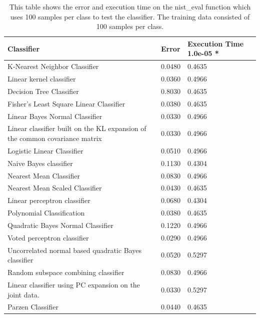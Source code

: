 \documentclass[%
        compressed,
        final,
        notitlepage,
        narroweqnarray,
        inline,
        twoside,
        ]{ieee}
\begin{document}
\begin{table}
    \begin{tabular} {p{5cm}lp{1.5cm}} %
        \hline
    Classifier & Error & Execution Time 1.0e-05 * \\
        \hline
K-Nearest Neighbor Classifier & 0.0480 & 0.4635 \\
Linear kernel classifier & 0.0360 & 0.4966 \\
Decision Tree Classifier & 0.8030 & 0.4635 \\
Fisher's Least Square Linear Classifier & 0.0380 & 0.4635 \\
Linear Bayes Normal Classifier & 0.0330 & 0.4966 \\
Linear classifier built on the KL expansion of the common covariance matrix & 0.0330 & 0.4966 \\
Logistic Linear Classifier & 0.0510 & 0.4966 \\
Naive Bayes classifier & 0.1130 & 0.4304 \\
Nearest Mean Classifier & 0.0830 & 0.4966 \\
Nearest Mean Scaled Classifier & 0.0430 & 0.4635 \\
Linear perceptron classifier & 0.0680 & 0.4304 \\
Polynomial Classification & 0.0380 & 0.4635 \\
Quadratic Bayes Normal Classifier & 0.1220 & 0.4966 \\
Voted perceptron classifier & 0.0290 & 0.4966 \\
Uncorrelated normal based quadratic Bayes classifier & 0.0520 & 0.5297 \\
Random subspace combining classifier & 0.0830 & 0.4966 \\
Linear classifier using PC expansion on the joint data. & 0.0330 & 0.5297 \\
Parzen Classifier & 0.0440 & 0.4635 \\
        \hline
    \end{tabular}
    \caption{ 
        This table shows the error and execution time on the nist\_eval function
        which uses 100 samples per class to test the classifier. The training
        data consisted of 100 samples per class. }
        
\end{table}
\end{document}
